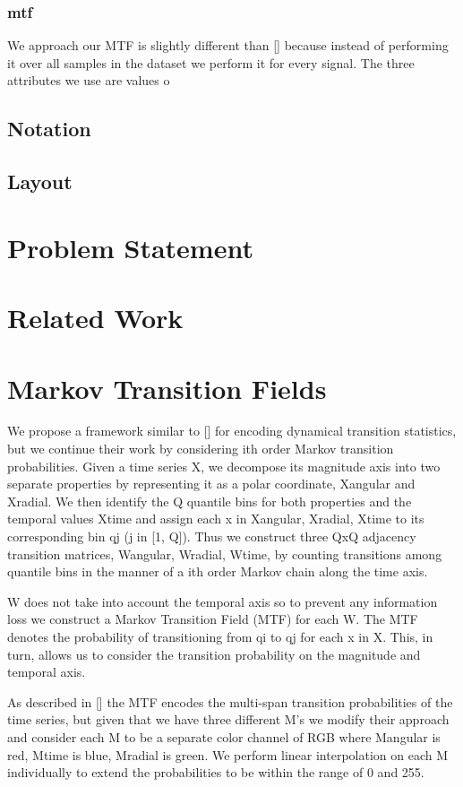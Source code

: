 \documentclass{turabian-thesis}
\begin{document}
\subsection{mtf}
We approach our MTF is slightly different than [] because instead of performing it over all samples in the dataset we perform it for every signal. The three attributes we use are values o 

\section{Notation}

\section{Layout}

\chapter{Problem Statement}


\chapter{Related Work}
 

\chapter{Markov Transition Fields}
We propose a framework similar to [] for encoding dynamical transition statistics,
but we continue their work by considering ith order Markov transition probabilities.
Given a time series X, we decompose its magnitude axis into two separate
properties by representing it as a polar coordinate, Xangular and Xradial. We then
identify the Q quantile bins for both properties and the temporal values Xtime
and assign each x in Xangular, Xradial, Xtime to its corresponding bin qj (j in
[1, Q]). Thus we construct three QxQ adjacency transition matrices, Wangular,
Wradial, Wtime, by counting transitions among quantile bins in the manner of a
ith order Markov chain along the time axis.

W does not take into account the temporal axis so to prevent any information
loss we construct a Markov Transition Field (MTF) for each W. The MTF
denotes the probability of transitioning from qi to qj for each x in X. This,
in turn, allows us to consider the transition probability on the magnitude and
temporal axis.

As described in [] the MTF encodes the multi-span transition probabilities
of the time series, but given that we have three different M’s we modify their
approach and consider each M to be a separate color channel of RGB where
Mangular is red, Mtime is blue, Mradial is green. We perform linear interpolation
on each M individually to extend the probabilities to be within the range of 0 and 255.
\end{document}
